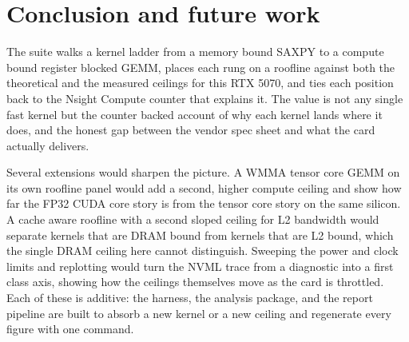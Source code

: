 \section{Conclusion and future work}

The suite walks a kernel ladder from a memory bound SAXPY to a compute bound
register blocked GEMM, places each rung on a roofline against both the
theoretical and the measured ceilings for this RTX 5070, and ties each position
back to the Nsight Compute counter that explains it. The value is not any single
fast kernel but the counter backed account of why each kernel lands where it
does, and the honest gap between the vendor spec sheet and what the card actually
delivers.

Several extensions would sharpen the picture. A WMMA tensor core GEMM on its own
roofline panel would add a second, higher compute ceiling and show how far the
FP32 CUDA core story is from the tensor core story on the same silicon. A cache
aware roofline with a second sloped ceiling for L2 bandwidth would separate
kernels that are DRAM bound from kernels that are L2 bound, which the single
DRAM ceiling here cannot distinguish. Sweeping the power and clock limits and
replotting would turn the NVML trace from a diagnostic into a first class axis,
showing how the ceilings themselves move as the card is throttled. Each of these
is additive: the harness, the analysis package, and the report pipeline are built
to absorb a new kernel or a new ceiling and regenerate every figure with one
command.
